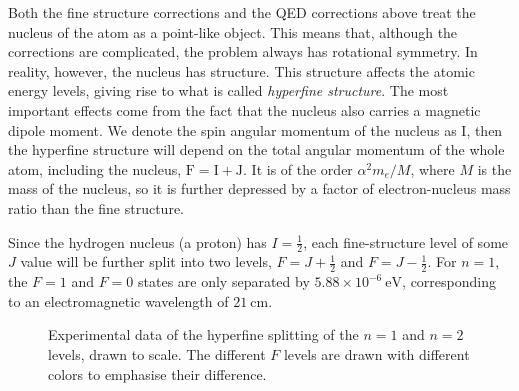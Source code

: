 \documentclass{article}
\theoremstyle{plain}\theoremheaderfont{\normalfont\itshape}\theorembodyfont{\rmfamily}\theoremseparator{.}\newtheorem*{rem}{Remark}\newtheorem*{ex}{Example}\newtheorem*{proof}{Proof}\newtheorem*{altp}{Alternative proof}
\theoremstyle{plain}\theoremheaderfont{\normalfont\bfseries}\theorembodyfont{\rmfamily}\theoremseparator{.}\newtheorem{thm}{Theorem}[section]\newtheorem{lem}[thm]{Lemma}\newtheorem{prop}[thm]{Proposition}\newtheorem*{cor}{Corollary}\newtheorem{defn}[thm]{Definition}\newtheorem{clm}[thm]{Claim}\newtheorem{clminproof}{Claim}
\theoremstyle{break}\theoremheaderfont{\normalfont\itshape}\theorembodyfont{\rmfamily}\theoremseparator{.\medskip}\newtheorem*{proofskip}{Proof}\newtheorem*{exs}{Examples}\newtheorem*{rems}{Remarks}
\theoremstyle{break}\theoremheaderfont{\normalfont\bfseries}\theorembodyfont{\rmfamily}\theoremseparator{.\medskip}\newtheorem{lemskip}[thm]{Lemma}\newtheorem{defnskip}[thm]{Definition}\newtheorem{propskip}[thm]{Proposition}\newtheorem{thmskip}[thm]{Theorem}
\numberwithin{equation}{section}
\newcommand{\unit}[1]{\ \mathrm{#1}}
\newcommand{\vb}[1]{\bm{\mathrm{#1}}}
\begin{document}
    Both the fine structure corrections and the QED corrections above treat the nucleus of the atom as a point-like object. This means that, although the corrections are complicated, the problem always has rotational symmetry. In reality, however, the nucleus has structure. This structure affects the atomic energy levels, giving rise to what is called \textit{hyperfine structure}. The most important effects come from the fact that the nucleus also carries a magnetic dipole moment. We denote the spin angular momentum of the nucleus as \(\vb{I}\), then the hyperfine structure will depend on the total angular momentum of the whole atom, including the nucleus, \(\vb{F}=\vb{I}+\vb{J}\). It is of the order \(\alpha^2 m_e/M\), where \(M\) is the mass of the nucleus, so it is further depressed by a factor of electron-nucleus mass ratio than the fine structure.

    Since the hydrogen nucleus (a proton) has \(I=\frac{1}{2}\), each fine-structure level of some \(J\) value will be further split into two levels, \(F=J+\frac{1}{2}\) and \(F=J-\frac{1}{2}\). For \(n=1\), the \(F=1\) and \(F=0\) states are only separated by \(5.88\times 10^{-6}\unit{eV}\), corresponding to an electromagnetic wavelength of \(21\unit{cm}\).

    \begin{figure}
        \centering
        \caption{Experimental data of the hyperfine splitting of the \(n=1\) and \(n=2\) levels, drawn to scale. The different \(F\) levels are drawn with different colors to emphasise their difference.}
    \end{figure}
\end{document}
